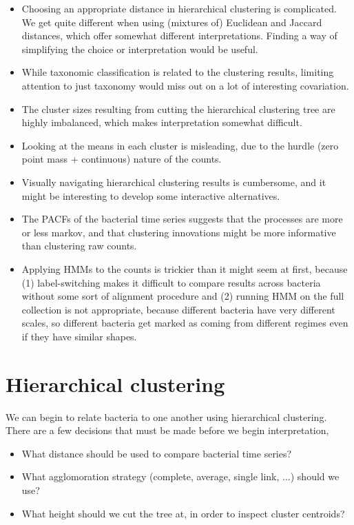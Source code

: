 \documentclass{article}
\begin{document}
\begin{itemize}
\item Choosing an appropriate distance in hierarchical clustering is
  complicated. We get quite different when using (mixtures of) Euclidean and
  Jaccard distances, which offer somewhat different interpretations. Finding a
  way of simplifying the choice or interpretation would be useful.
\item While taxonomic classification is related to the clustering results,
  limiting attention to just taxonomy would miss out on a lot of interesting
  covariation.
\item The cluster sizes resulting from cutting the hierarchical clustering tree
  are highly imbalanced, which makes interpretation somewhat difficult.
\item Looking at the means in each cluster is misleading, due to the hurdle
  (zero point mass + continuous) nature of the counts.
\item Visually navigating hierarchical clustering results is cumbersome, and it
  might be interesting to develop some interactive alternatives.
\item The PACFs of the bacterial time series suggests that the processes are
  more or less markov, and that clustering innovations might be more informative
  than clustering raw counts.
\item Applying HMMs to the counts is trickier than it might seem at first,
  because (1) label-switching makes it difficult to compare results across
  bacteria without some sort of alignment procedure and (2) running HMM on the
  full collection is not appropriate, because different bacteria have very
  different scales, so different bacteria get marked as coming from different
  regimes even if they have similar shapes.
\end{itemize}

\section{Hierarchical clustering}

We can begin to relate bacteria to one another using hierarchical clustering.
There are a few decisions that must be made before we begin interpretation,

\begin{itemize}
  \item What distance should be used to compare bacterial time series?
  \item What agglomoration strategy (complete, average, single link, ...) should we use?
  \item What height should we cut the tree at, in order to inspect cluster centroids?
\end{itemize}
\end{document}
